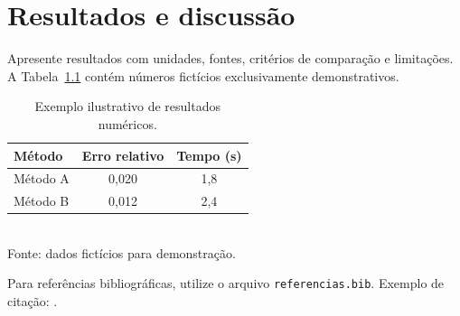 \chapter{Resultados e discussão}
Apresente resultados com unidades, fontes, critérios de comparação e limitações. A Tabela~\ref{tab:exemplo} contém números fictícios exclusivamente demonstrativos.
\begin{table}[htbp]\centering\caption{Exemplo ilustrativo de resultados numéricos.}\label{tab:exemplo}\begin{tabular}{lcc}\toprule Método & Erro relativo & Tempo (s)\\\midrule Método A & 0,020 & 1,8\\Método B & 0,012 & 2,4\\\bottomrule\end{tabular}\\\smallskip\footnotesize Fonte: dados fictícios para demonstração.\end{table}
Para referências bibliográficas, utilize o arquivo \texttt{referencias.bib}. Exemplo de citação: \textcite{lamport1994}.
